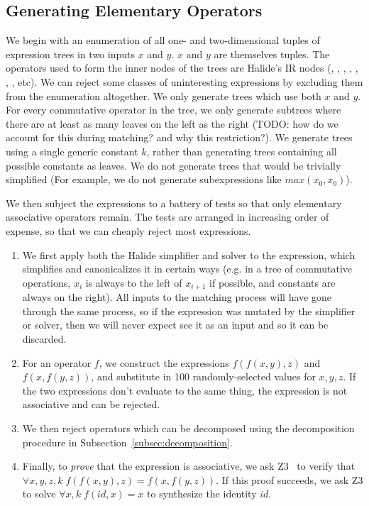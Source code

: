 \subsection{Generating Elementary Operators}
\label{subsec:generation}

We begin with an enumeration of all one- and two-dimensional tuples of expression trees in two inputs $x$ and $y$. $x$ and $y$ are themselves tuples. The operators used to form the inner nodes of the trees are Halide's IR nodes (\code{*}, \code{+}, \code{-}, , , , \code{<}, etc). We can reject some classes of uninteresting expressions by excluding them from the enumeration altogether. We only generate trees which use both $x$ and $y$. For every commutative operator in the tree, we only generate subtrees where there are at least as many leaves on the left as the right (TODO: how do we account for this during matching? and why this restriction?). We generate trees using a single generic constant $k$, rather than generating trees containing all possible constants as leaves. We do not generate trees that would be trivially simplified (For example, we do not generate subexpressions like $max(x_0, x_0)$).

We then subject the expressions to a battery of tests so that only elementary associative operators remain. The tests are arranged in increasing order of expense, so that we can cheaply reject most expressions.

\begin{enumerate}
\item We first apply both the Halide simplifier and solver to the expression, which simplifies and canonicalizes it in certain ways (e.g. in a tree of commutative operations, $x_i$ is always to the left of $x_{i+1}$ if possible, and constants are always on the right). All inputs to the matching process will have gone through the same process, so if the expression was mutated by the simplifier or solver, then we will never expect see it as an input and so it can be discarded.
\item For an operator $f$, we construct the expressions $f(f(x, y), z)$ and $f(x, f(y, z))$, and substitute in 100 randomly-selected values for $x, y, z$. If the two expressions don't evaluate to the same thing, the expression is not associative and can be rejected.
\item We then reject operators which can be decomposed using the decomposition procedure in Subsection~\ref{subsec:decomposition}.
\item Finally, to \emph{prove} that the expression is associative, we ask Z3~\cite{DeMoura:2008:ZES:1792734.1792766} to verify that $\forall x, y, z, k \;f(f(x, y), z) = f(x, f(y, z))$. If this proof succeeds, we ask Z3 to solve $\forall x, k \;f(id, x) = x$ to synthesize the identity $id$.
\end{enumerate}

